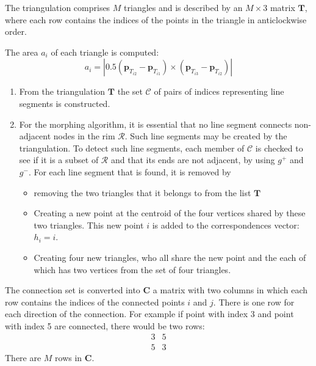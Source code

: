 \documentclass{article}
\renewcommand{\vec}[1]{\mathbf{#1}}
\begin{document}
The triangulation comprises $M$ triangles and is described by an
$M\times3$ matrix $\mathbf{T}$, where each row contains the indices
of the points in the triangle in anticlockwise order.

The area $a_i$ of each triangle is computed:
\begin{displaymath}
  a_i = |0.5 (\vec{p}_{T_{i2}}-\vec{p}_{T_{i1}})\times
  (\vec{p}_{T_{i3}}-\vec{p}_{T_{i2}})|
\end{displaymath}

\begin{enumerate}
\item From the triangulation $\mathbf{T}$ the set $\mathcal{C}$ of pairs of
  indices representing line segments is constructed. 
\item For the morphing algorithm, it is essential that no line segment
  connects non-adjacent nodes in the rim $\mathcal{R}$. Such line
  segments may be created by the triangulation. To detect such line
  segments, each member of $\mathcal{C}$ is checked to see if it is a
  subset of $\mathcal{R}$ and that its ends are not adjacent, by
  using $g^+$ and $g^-$. For each line segment that is found, it is
  removed by
  \begin{itemize}
  \item removing the two triangles that it belongs to from the list
    $\mathbf{T}$
  \item Creating a new point at the centroid of the four vertices
    shared by these two triangles. This new point $i$ is added to the
    correspondences vector: $h_i=i$.
  \item Creating four new triangles, who all share the new point and
    the each of which has two vertices from the set of four
    triangles.
  \end{itemize}
\end{enumerate}



The connection set is converted into $\mathbf{C}$ a matrix with two
columns in which each row contains the indices of the connected
points $i$ and $j$. There is one row for each direction of the
connection. For example if point with index 3 and point with index 5
are connected, there would be two rows:
\begin{displaymath}
  \begin{array}{cc}
    3 & 5 \\
    5 & 3
  \end{array}
\end{displaymath}
There are $M$ rows in $\mathbf{C}$.
\end{document}
